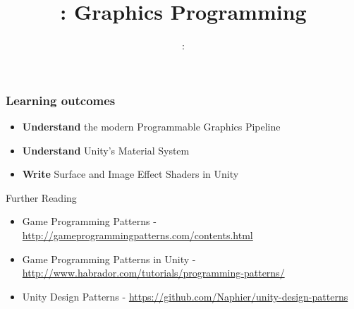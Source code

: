 \usepackage{../../beamerthemeFalmouthGamesAcademy}
\usepackage{multimedia}
\graphicspath{ {../../} }

\usepackage[normalem]{ulem}
\usepackage{wasysym}

\usepackage{pdfpages}



\usetikzlibrary{arrows,automata}




\title{\sessionnumber: Graphics Programming}
\subtitle{\modulecode: \moduletitle}

\frame{\titlepage} 

\begin{frame}
	\frametitle{Learning outcomes}
	\begin{itemize}
		\item \textbf{Understand} the modern Programmable Graphics Pipeline
		\item \textbf{Understand} Unity's Material System
		\item \textbf{Write} Surface and Image Effect Shaders in Unity
	\end{itemize}
\end{frame}






\begin{frame}{Further Reading}
	\begin{itemize}
		\item Game Programming Patterns - \url{http://gameprogrammingpatterns.com/contents.html}
		\item Game Programming Patterns in Unity - \url{http://www.habrador.com/tutorials/programming-patterns/}
		\item Unity Design Patterns - \url{https://github.com/Naphier/unity-design-patterns}
	\end{itemize}
\end{frame}
